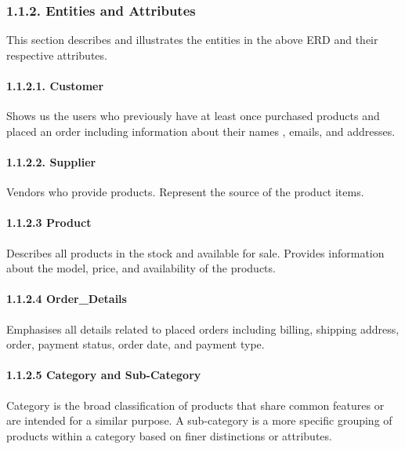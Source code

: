 \documentclass[
]{article}
\begin{document}
\hypertarget{entities-and-attributes}{%
\subsubsection{1.1.2. Entities and
Attributes}\label{entities-and-attributes}}

This section describes and illustrates the entities in the above ERD and
their respective attributes.

\hypertarget{customer}{%
\paragraph{1.1.2.1. Customer}\label{customer}}

Shows us the users who previously have at least once purchased products
and placed an order including information about their names , emails,
and addresses.

\hypertarget{supplier}{%
\paragraph{1.1.2.2. Supplier}\label{supplier}}

Vendors who provide products. Represent the source of the product items.

\hypertarget{product}{%
\paragraph{1.1.2.3 Product}\label{product}}

Describes all products in the stock and available for sale. Provides
information about the model, price, and availability of the products.

\hypertarget{order_details}{%
\paragraph{1.1.2.4 Order\_Details}\label{order_details}}

Emphasises all details related to placed orders including billing,
shipping address, order, payment status, order date, and payment type.

\hypertarget{category-and-sub-category}{%
\paragraph{1.1.2.5 Category and
Sub-Category}\label{category-and-sub-category}}

Category is the broad classification of products that share common
features or are intended for a similar purpose. A sub-category is a more
specific grouping of products within a category based on finer
distinctions or attributes.
\end{document}
